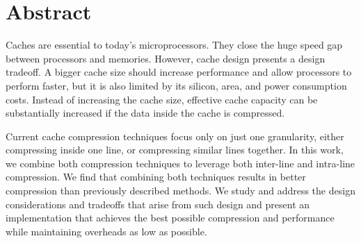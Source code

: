 
\chapter{Abstract}
Caches are essential to today's microprocessors. They close the huge speed gap between processors and memories. However, cache design presents a design tradeoff. A bigger cache size should increase performance and allow processors to perform faster, but it is also limited by its silicon, area, and power consumption costs. Instead of increasing the cache size, effective cache capacity can be substantially increased if the data inside the cache is compressed.\par
Current cache compression techniques focus only on just one granularity, either compressing inside one line, or compressing similar lines together. In this work, we combine both compression techniques to leverage both inter-line and intra-line compression. We find that combining both techniques results in better compression than previously described methods. We study and address the design considerations and tradeoffs that arise from such design and present an implementation that achieves the best possible compression and performance while maintaining overheads as low as possible.

